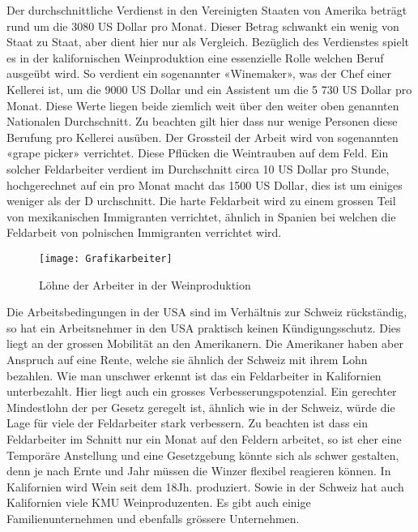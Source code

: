 Der durchschnittliche Verdienst in den Vereinigten Staaten von Amerika beträgt rund um die 3080 US Dollar pro Monat. \cite{_assistant} Dieser Betrag schwankt ein wenig von Staat zu Staat, aber dient hier nur als Vergleich. Bezüglich des Verdienstes spielt es in der kalifornischen Weinproduktion eine essenzielle Rolle welchen Beruf ausgeübt wird. So verdient ein sogenannter «Winemaker», was der Chef einer Kellerei ist, um die 9000 US
Dollar und ein Assistent um die 5 730 US Dollar pro Monat. Diese Werte liegen beide ziemlich weit über den weiter oben genannten Nationalen Durchschnitt. Zu beachten gilt hier dass nur wenige Personen diese Berufung pro Kellerei ausüben. Der Grossteil der Arbeit
wird von sogenannten «grape picker» verrichtet. Diese Pflücken die Weintrauben auf dem Feld. Ein solcher Feldarbeiter verdient im Durchschnitt circa 10 US Dollar pro Stunde,
\cite{_farm} hochgerechnet auf ein pro Monat macht das 1500 US Dollar, dies ist um einiges weniger als der D
urchschnitt. Die harte Feldarbeit wird zu einem grossen Teil von mexikanischen Immigranten verrichtet, ähnlich in Spanien bei welchen die Feldarbeit von polnischen Immigranten verrichtet wird.
\begin{figure}[H]
	\centering
	\texttt{[image: Grafikarbeiter]}
	\caption{Löhne der Arbeiter in der Weinproduktion}
\end{figure}
Die Arbeitsbedingungen in der USA sind im Verhältnis zur Schweiz rückständig, so hat ein Arbeitsnehmer in den USA praktisch keinen Kündigungsschutz. Dies liegt an der grossen Mobilität an den Amerikanern. Die Amerikaner haben aber Anspruch auf eine Rente, welche sie ähnlich der Schweiz mit ihrem Lohn bezahlen. \cite{_arbeitszeiten} Wie man unschwer erkennt ist das ein Feldarbeiter in Kalifornien unterbezahlt. Hier liegt auch ein grosses Verbesserungspotenzial. Ein gerechter Mindestlohn der per Gesetz geregelt ist, ähnlich wie in der Schweiz, würde die Lage für viele der Feldarbeiter stark verbessern. Zu beachten ist dass ein Feldarbeiter im Schnitt nur ein Monat auf den Feldern arbeitet, so ist eher eine Temporäre Anstellung und eine Gesetzgebung könnte sich als schwer gestalten, denn je nach Ernte und Jahr  müssen die Winzer flexibel reagieren können. In Kalifornien wird Wein seit dem 18Jh. produziert. Sowie in der Schweiz hat auch Kalifornien viele KMU Weinproduzenten. Es gibt auch einige Familienunternehmen und ebenfalls grössere Unternehmen.



